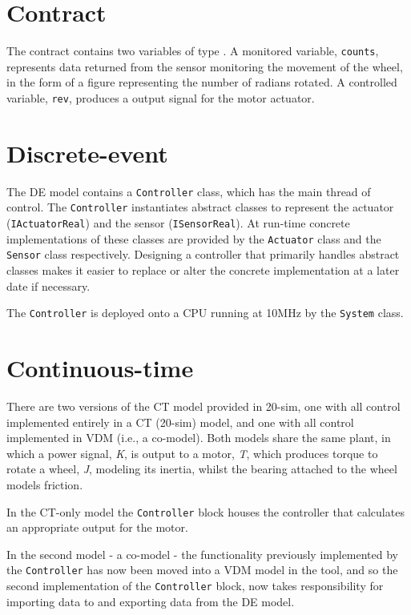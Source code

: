 \section{Contract} The contract contains two variables of type
. A monitored variable, \texttt{counts}, represents data
returned from the sensor monitoring the movement of the wheel, in the
form of a figure representing the number of radians rotated. A
controlled variable, \texttt{rev}, produces a output signal for the
motor actuator.

\section{Discrete-event} The DE model contains a
\texttt{Controller} class, which has the main thread of control.  The
\texttt{Control\-ler} instantiates abstract classes to represent the
actuator (\texttt{IActuatorReal}) and the sensor
(\texttt{ISensorReal}). At run-time concrete implementations of these
classes are provided by the \texttt{Actuator} class and the
\texttt{Sensor} class respectively. Designing a controller that
primarily handles abstract classes makes it easier to replace or alter
the concrete implementation at a later date if necessary.

The \texttt{Controller} is deployed onto a CPU running at 10MHz
by the \texttt{System} class.

\section{Continuous-time} There are two versions of the CT model
provided in 20-sim, one with all control implemented entirely in a CT
(20-sim) model, and one with all control implemented in VDM (i.e., a
\DESTECS co-model). Both models share the same plant, in which a power
signal, \emph{K}, is output to a motor, \emph{T}, which produces torque to rotate
a wheel, \emph{J}, modeling its inertia, whilst the bearing attached to the wheel models friction.

In the CT-only model the
\texttt{Controller} block houses the controller that calculates an
appropriate output for the motor. 

In the second model - a \DESTECS co-model - the
functionality previously implemented by the \texttt{Controller}
has now been moved into a VDM model in the \DESTECS tool, and so the second implementation of the 
\texttt{Controller} block, now takes responsibility for importing data to and exporting data
from the DE model. 

